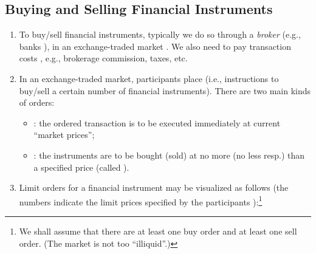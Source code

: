 \subsection{Buying and Selling Financial Instruments}
\begin{enumerate}
\item To buy/sell financial instruments, typically we do so through a
\emph{broker} (e.g., banks ), in an exchange-traded market
.  We also need to pay transaction costs
, e.g., brokerage commission, taxes, etc.

\item In an exchange-traded market, participants place  (i.e.,
instructions to buy/sell a certain number of financial instruments). There are
two main kinds of orders:
\begin{itemize}
\item {}: the ordered transaction is to be executed immediately at
current ``market prices'';
\item {}: the instruments are to be bought (sold) at no more
(no less resp.) than a specified price (called ).
\end{itemize}

\item Limit orders for a financial instrument may be visualized as follows (the
numbers indicate the limit prices specified by the participants
):\footnote{We shall assume that there are at least one buy order
and at least one sell order. (The market is not too ``illiquid''.)}
\begin{center}
\end{center}


\end{enumerate}
